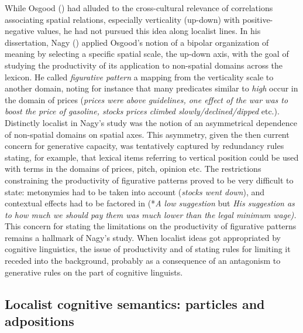 \documentclass[output=paper]{langscibook}
\begin{document}
While Osgood (\citet{osgood_nature_1952}) had alluded to the cross-cultural relevance of correlations associating spatial relations, especially verticality (up-down) with positive-negative values, he had not pursued this idea along localist lines. In his dissertation, Nagy (\citeyear{nagy_figurative_1974}) applied Osgood’s notion of a bipolar organization of meaning by selecting a specific spatial scale, the up-down axis, with the goal of studying the productivity of its application to non-spatial domains across the lexicon. He called \textit{figurative pattern} a mapping from the verticality scale to another domain, noting for instance that many predicates similar to \textit{high} occur in the domain of prices (\textit{prices were above guidelines, one effect of the war was to boost the price of gasoline, stocks prices climbed slowly\slash declined\slash dipped} etc.). Distinctly localist in Nagy’s study was the notion of an asymmetrical dependence of non-spatial domains on spatial axes. This asymmetry, given the then current concern for generative capacity, was tentatively captured by redundancy rules stating, for example, that lexical items referring to vertical position could be used with terms in the domains of prices, pitch, opinion etc. The restrictions constraining the productivity of figurative patterns proved to be very difficult to state: metonymies had to be taken into account (\textit{stocks went down}), and contextual effects had to be factored in (*\textit{A low suggestion} but \textit{His suggestion as to how much we should pay them was much lower than the legal minimum wage).} This concern for stating the limitations on the productivity of figurative patterns remains a hallmark of Nagy’s study. When localist ideas got appropriated by cognitive linguistics, the issue of productivity and of stating rules for limiting it receded into the background, probably as a consequence of an antagonism to generative rules on the part of cognitive linguists. 

\subsection{Localist cognitive semantics: particles and adpositions}
\end{document}
